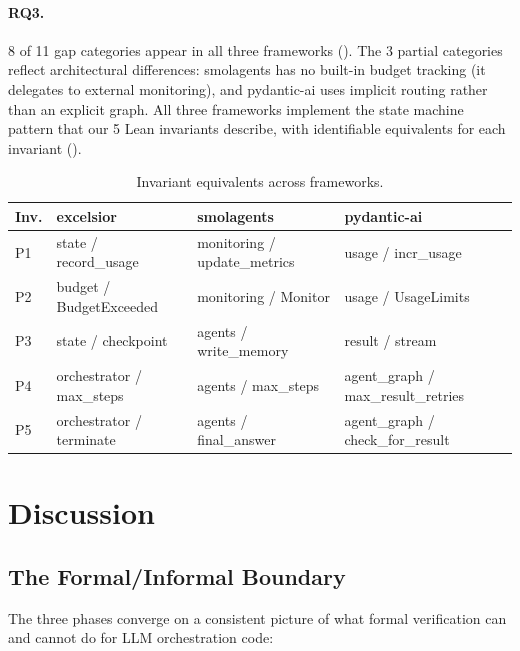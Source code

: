 \documentclass[11pt,a4paper]{article}
\begin{document}
\paragraph{RQ3.}
8 of 11 gap categories appear in all three frameworks
(). The 3 partial categories reflect
architectural differences: smolagents has no built-in budget tracking
(it delegates to external monitoring), and pydantic-ai uses implicit
routing rather than an explicit graph. All three frameworks implement
the state machine pattern that our 5 Lean invariants describe, with
identifiable equivalents for each invariant ().

\begin{table}[htbp]
\centering
\caption{Invariant equivalents across frameworks.}
\label{tab:invariantmap}
\footnotesize
\begin{tabular}{@{}llll@{}}
\toprule
\textbf{Inv.} & \textbf{excelsior} & \textbf{smolagents} & \textbf{pydantic-ai} \\
\midrule
P1 & state / record\_usage & monitoring / update\_metrics & usage / incr\_usage \\
P2 & budget / BudgetExceeded & monitoring / Monitor & usage / UsageLimits \\
P3 & state / checkpoint & agents / write\_memory & result / stream \\
P4 & orchestrator / max\_steps & agents / max\_steps & agent\_graph / max\_result\_retries \\
P5 & orchestrator / terminate & agents / final\_answer & agent\_graph / check\_for\_result \\
\bottomrule
\end{tabular}
\end{table}

\section{Discussion}
\label{sec:discussion}

\subsection{The Formal/Informal Boundary}

The three phases converge on a consistent picture of what formal
verification can and cannot do for LLM orchestration code:
\end{document}
